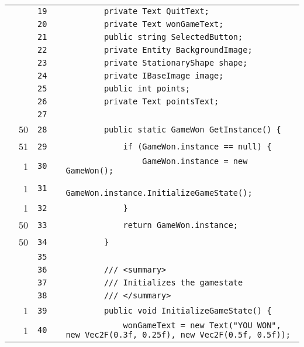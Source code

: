 \documentclass[a4paper,landscape,10pt]{article}
\begin{document}
\begin{longtable}[l]{lrrll}
\cellcolor{gray} &  & \verb~19~ & & \verb~        private Text QuitText;~\\
\cellcolor{gray} &  & \verb~20~ & & \verb~        private Text wonGameText;~\\
\cellcolor{gray} &  & \verb~21~ & & \verb~        public string SelectedButton;~\\
\cellcolor{gray} &  & \verb~22~ & & \verb~        private Entity BackgroundImage;~\\
\cellcolor{gray} &  & \verb~23~ & & \verb~        private StationaryShape shape;~\\
\cellcolor{gray} &  & \verb~24~ & & \verb~        private IBaseImage image;~\\
\cellcolor{gray} &  & \verb~25~ & & \verb~        public int points;~\\
\cellcolor{gray} &  & \verb~26~ & & \verb~        private Text pointsText;~\\
\cellcolor{gray} &  & \verb~27~ & & \verb~~\\
\cellcolor{green} & 50 & \verb~28~ & & \verb~        public static GameWon GetInstance() {~\\
\cellcolor{green} & 51 & \verb~29~ & & \verb~            if (GameWon.instance == null) {~\\
\cellcolor{green} & 1 & \verb~30~ & & \verb~                GameWon.instance = new GameWon();~\\
\cellcolor{green} & 1 & \verb~31~ & & \verb~                GameWon.instance.InitializeGameState();~\\
\cellcolor{green} & 1 & \verb~32~ & & \verb~            }~\\
\cellcolor{green} & 50 & \verb~33~ & & \verb~            return GameWon.instance;~\\
\cellcolor{green} & 50 & \verb~34~ & & \verb~        }~\\
\cellcolor{gray} &  & \verb~35~ & & \verb~~\\
\cellcolor{gray} &  & \verb~36~ & & \verb~        /// <summary>~\\
\cellcolor{gray} &  & \verb~37~ & & \verb~        /// Initializes the gamestate~\\
\cellcolor{gray} &  & \verb~38~ & & \verb~        /// </summary>~\\
\cellcolor{green} & 1 & \verb~39~ & & \verb~        public void InitializeGameState() {~\\
\cellcolor{green} & 1 & \verb~40~ & & \verb~            wonGameText = new Text("YOU WON", new Vec2F(0.3f, 0.25f), new Vec2F(0.5f, 0.5f));~\\

\end{longtable}
\end{document}
